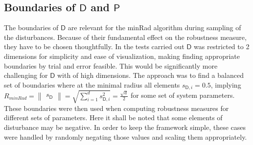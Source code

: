 

\subsection{Boundaries of $\mathsf{D}$ and $\mathsf{P}$ }

    The boundaries of $\mathsf{D}$ are relevant for the minRad algorithm during sampling of the disturbances. Because of their fundamental effect on the robustness measure, they have to be chosen thoughtfully. In the tests carried out $\mathsf{D}$ was restricted to 2 dimensions for simplicity and ease of visualization, making finding appropriate boundaries by trial and error feasible. This would be significantly more challenging for $\mathsf{D}$ with of high dimensions. The approach was to find a balanced set of boundaries where at the minimal radius all elements $s_{\mathsf{D},i} = 0.5$, implying $R_{minRad} = \begin{Vmatrix}s_{\mathsf{D}}\end{Vmatrix}= \sqrt{\sum_{i=1}^{d} s_{\mathsf{D},i}^2} = \frac{\sqrt{d}}{2}$ for some set of system parameters. These boundaries were then used when computing robustness measures for different sets of parameters. 
    Here it shall be noted that some elements of disturbance may be negative. In order to keep the framework simple, these cases were handled by randomly negating those values and scaling them appropriately. 

 




